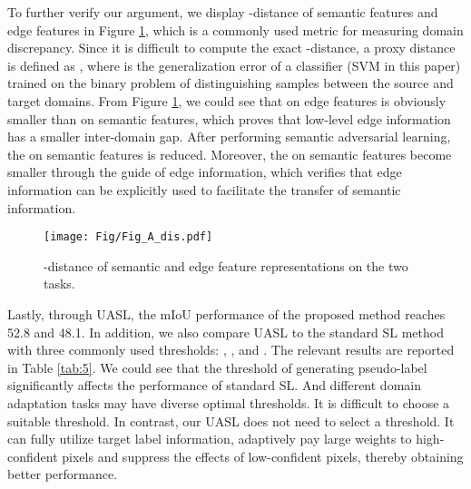 \documentclass[sigconf]{acmart}
\begin{document}
\par To further verify our argument, we display -distance \cite{ben2007analysis} of semantic features and edge features in Figure \ref{fig:6}, which is a commonly used metric for measuring domain discrepancy. Since it is difficult to compute the exact -distance, a proxy distance is defined as  \cite{ben2007analysis}, where  is the generalization error of a classifier (SVM in this paper) trained on the binary problem of distinguishing samples between the source and target domains. From Figure \ref{fig:6}, we could see that  on edge features is obviously smaller than  on semantic features, which proves that low-level edge information has a smaller inter-domain gap. After performing semantic adversarial learning, the  on semantic features is reduced. Moreover, the  on semantic features become smaller through the guide of edge information, which verifies that edge information can be explicitly used to facilitate the transfer of semantic information. 

\begin{figure}[!t]
    \centering
    \texttt{[image: Fig/Fig\_A\_dis.pdf]}
    \caption{-distance of semantic and edge feature representations on the two tasks.}
    \label{fig:6}
\end{figure}

\par Lastly, through UASL, the mIoU performance of the proposed method reaches 52.8 and 48.1. In addition, we also compare UASL to the standard SL method with three commonly used thresholds:  \cite{pan2020unsupervised},   \cite{lian2019constructing}, and  \cite{kim2020learning}. The relevant results are reported in Table \ref{tab:5}. We could see that the threshold of generating pseudo-label  significantly affects the performance of standard SL. And different domain adaptation tasks may have diverse optimal thresholds. It is difficult to choose a suitable threshold. In contrast, our UASL does not need to select a threshold. It can fully utilize target label information, adaptively pay large weights to high-confident pixels and suppress the effects of low-confident pixels, thereby obtaining better performance.
\end{document}
